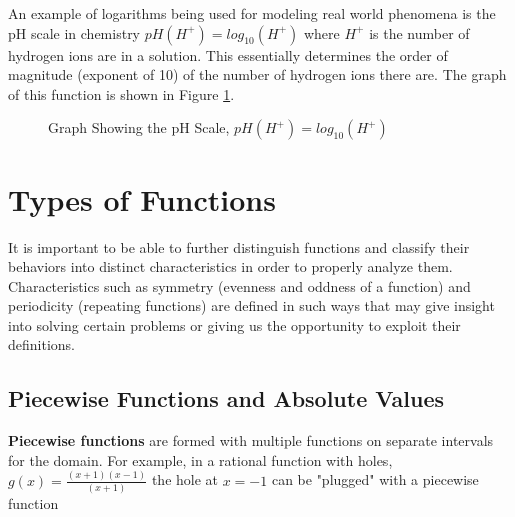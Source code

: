         \begin{example}
            An example of logarithms being used for modeling real world phenomena is the pH scale in chemistry $pH(H^+) = log_{10}(H^+)$ where $H^+$ is the number of hydrogen ions are in a solution. This essentially determines the order of magnitude (exponent of 10) of the number of hydrogen ions there are. The graph of this function is shown in Figure \ref{fig:pHgraph}.

            \begin{figure}
                \centering
                \caption{Graph Showing the pH Scale, $pH(H^+) = log_{10}(H^+)$}
                \label{fig:pHgraph}
            \end{figure}

        \end{example}

        \section{Types of Functions}
        It is important to be able to further distinguish functions and classify their behaviors into distinct characteristics in order to properly analyze them. Characteristics such as symmetry (evenness and oddness of a function) and periodicity (repeating functions) are defined in such ways that may give insight into solving certain problems or giving us the opportunity to exploit their definitions.

        \subsection{Piecewise Functions and Absolute Values}
        \textbf{Piecewise functions} are formed with multiple functions on separate intervals for the domain. For example, in a rational function with holes, $g(x) = \frac{(x+1)(x-1)}{(x+1)}$ the hole at $x = -1$ can be "plugged" with a piecewise function

